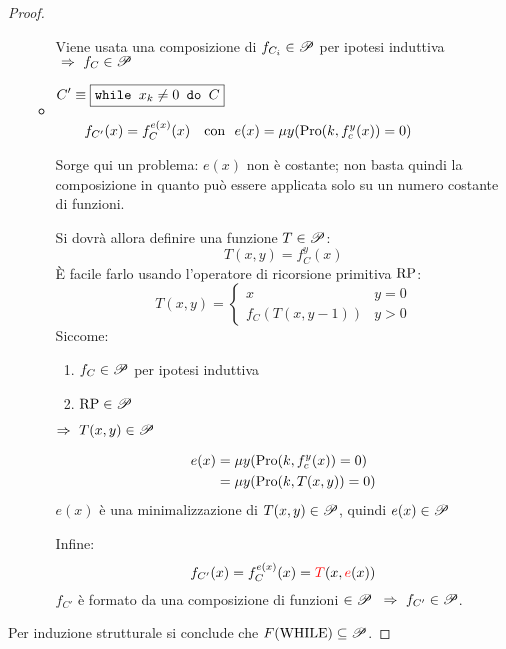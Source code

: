 \begin{proof}
\begin{itemize}
\begin{itemize}
                Viene usata una composizione di $f_{C_i}\in\mathscr{P}$
                per ipotesi induttiva $\ \Rightarrow \ f_{C}\in\ricPar $

                \renewcommand{\labelitemii}{\raisebox{2.1\height}{$-$}}
                \item $\begin{aligned}
                    &C'\equiv \boxed{ \texttt{while } x_k\neq0 \texttt{ do } {C}}\\[.6em]
                    &\hspace{2em}f_{C'}(x) = f_C^{e(x)}(x)
                    \ \ \text{ con } \ e(x)=\mu y(\text{Pro}(k,f_c^y(x))=0)\\
                \end{aligned}$

                Sorge qui un problema: $e(x)$ non è costante; non basta quindi 
                la composizione in quanto può essere applicata solo su un numero 
                costante di funzioni.

                Si dovrà allora definire una funzione $T\in\mathscr{P}$:
                $$T(x,y)=f_C^y(x)$$
                È facile farlo usando l'operatore di ricorsione primitiva $\text{RP}$:
                $$ T(x,y) = \begin{cases}
                    x&y=0\\
                    f_C(T(x,y-1))&y>0
                \end{cases} $$
                Siccome:

                \begin{minipage}{.38\textwidth}
                \begin{enumerate}
                    \item $f_C\in\mathscr{P}$ per ipotesi induttiva
                    \item $\text{RP}\in\mathscr{P}$
                \end{enumerate}
                \end{minipage}
                \begin{minipage}{.4\textwidth}
                    $\Rightarrow \ T(x,y)\in\mathscr{P}$
                \end{minipage}
                
                $$ \begin{aligned}
                    e(x)&=\mu y(\text{Pro}(k,f_c^y(x))=0)\\
                    &=\mu y(\text{Pro}(k,T(x,y))=0)
                \end{aligned} $$
                $e(x)$ è una minimalizzazione di $T(x,y)\in\mathscr{P}$, quindi 
                $e(x)\in\mathscr{P}$

                Infine:
                $$ f_{C'}(x) = f_C^{e(x)}(x) = {\color{red}T}(x,{\color{red}e}(x)) $$
                $f_{C'}$ è formato da una composizione di funzioni $\in\mathscr{P}$
                $\ \Rightarrow \ f_{C'}\in\ricPar$.
            \end{itemize}
    \end{itemize}
    Per induzione strutturale si conclude che $F(\text{WHILE}) \subseteq \mathscr{P}$.
\end{proof}

